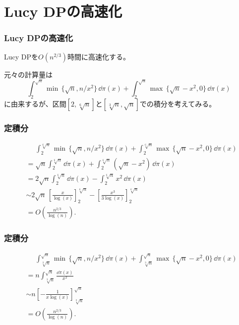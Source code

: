 \documentclass[
  lualatex,
  ja=standard,
  compress,
  hyperref={colorlinks, urlcolor=magenta, linkcolor=blue!55!black},
  dvipsnames,
  svgnames,
]{beamer}
\begin{document}
\section{Lucy DP\hspace{.1em}の高速化}
\begin{frame}
  \frametitle{Lucy DPの高速化}

  Lucy DPを$O(n^{2/3})$時間に高速化する。

  元々の計算量は
  $$
  \int_2^{\sqrt{n}} \min\,\{\sqrt{n}, n/x^2\}\, \dd{\pi(x)}
  + \int_2^{\sqrt{n}} \max\,\{\sqrt{n}-x^2, 0\} \, \dd{\pi(x)}
  $$
  に由来するが、区間$[2, \sqrt[6]{n}]$と$[\sqrt[3]{n}, \sqrt{n}]$での積分を考えてみる。
\end{frame}

\setcounter{slidetopic}{0}
\begin{frame}
  \frametitle{定積分 \theslidetopic}

  $$
  \begin{aligned}
    &\phantom{{}={}} \int_2^{\sqrt[6]{n}} \min\,\{\sqrt{n}, n/x^2\}\, \dd{\pi(x)}
    + \int_2^{\sqrt[6]{n}} \max\,\{\sqrt{n}-x^2, 0\} \, \dd{\pi(x)} \\
    &= \sqrt{n}\int_2^{\sqrt[6]{n}} \dd{\pi(x)}
    + \int_2^{\sqrt[6]{n}} (\sqrt{n}-x^2)\, \dd{\pi(x)} \\
    &= 2\sqrt{n}\int_2^{\sqrt[6]{n}} \dd{\pi(x)}
    - \int_2^{\sqrt[6]{n}} x^2\, \dd{\pi(x)} \\
    &\sim 2\sqrt{n}\,\left[\frac{x}{\log(x)}\right]_2^{\sqrt[6]{n}}
    - \left[\frac{x^3}{3\log(x)}\right]_2^{\sqrt[6]{n}} \\
    &= O{\left(\frac{n^{2/3}}{\log(n)}\right)}.
  \end{aligned}
  $$  
\end{frame}

\begin{frame}
  \frametitle{定積分 \theslidetopic}

  $$
  \begin{aligned}
    &\phantom{{}={}} \int_{\sqrt[3]{n}}^{\sqrt{n}} \min\,\{\sqrt{n}, n/x^2\}\, \dd{\pi(x)}
    + \int_{\sqrt[3]{n}}^{\sqrt{n}} \max\,\{\sqrt{n}-x^2, 0\} \, \dd{\pi(x)} \\
    &= n\int_{\sqrt[3]{n}}^{\sqrt{n}} \frac{\dd{\pi(x)}}{x^2} \\
    &\sim n\left[-\frac{1}{x\log(x)}\right]_{\sqrt[3]{n}}^{\sqrt{n}} \\
    &= O{\left(\frac{n^{2/3}}{\log(n)}\right)}.
  \end{aligned}
  $$  
\end{frame}
\end{document}
